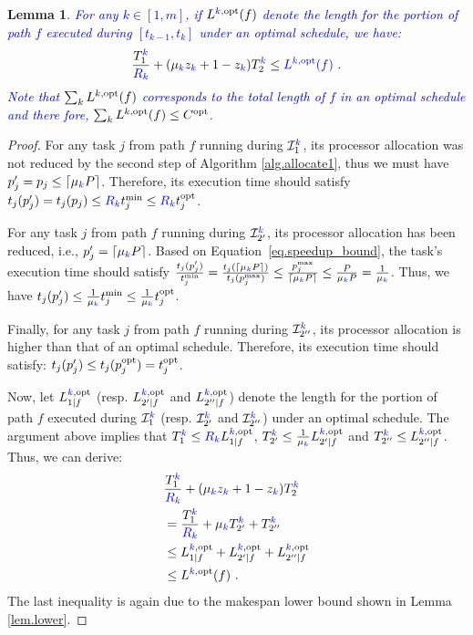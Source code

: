 \documentclass{article}
\newtheorem{lemma}{Lemma}
\newcommand\ratio{R\xspace}
\newcommand\opt{\textnormal{opt}\xspace}
\newcommand{\new}[1]{\textcolor{blue}{#1}}
\begin{document}
\begin{lemma}\label{lem.path}
\new{For any $k \in [1,m]$, if $L^{\new{k},\opt}(f)$ denote the length for the portion of path $f$ executed
during $[t_{k-1},t_k]$ under an optimal schedule, we have:}
\begin{equation}\label{CP}
\frac{T_1^{\new{k}}}{\new{\ratio_k}}  + (\mu_{\new{k}} z_{\new{k}}+1-z_{\new{k}}) T_2^{\new{k}} \le \new{L^{k,\opt}(f)} \ .
\end{equation}
\new{Note that $\sum_k L^{k,\opt}(f)$ corresponds to the total length of $f$ in an optimal schedule and there fore, $\sum_k L^{k,\opt}(f) \leq C^{\opt}$.}
\end{lemma}


\begin{proof}

For any task $j$ from path $f$ running during $\mathcal{I}_1^{\new{k}}$, its processor allocation was not reduced by the second step of Algorithm \ref{alg.allocate1}, thus we must have $p'_j = p_j \le \lceil \mu_{\new{k}} P \rceil$. Therefore, its execution time should satisfy $t_j(p'_j) = t_j(p_j) \le \new{\ratio_k} t_j^{\min} \le \new{\ratio_k} t_j^{\opt}$.

For any task $j$ from path $f$ running during $\mathcal{I}_{2'}^{\new{k}}$, its processor allocation has been reduced, i.e., $p'_j = \lceil \mu_{\new{k}} P \rceil$. Based on
Equation~\eqref{eq.speedup_bound}, the task's execution time should satisfy $\frac{t_j(p'_j)}{t_j^{\min}} = \frac{t_j(\lceil \mu_{\new{k}} P \rceil)}{t_j(p_j^{\max})} \le \frac{p_j^{\max}}{\lceil \mu_{\new{k}} P \rceil} \le \frac{P}{\mu_{\new{k}} P} = \frac{1}{\mu_{\new{k}}}$. Thus, we have $t_j(p'_j) \le \frac{1}{\mu_{\new{k}}} t_j^{\min} \le \frac{1}{\mu_{\new{k}}} t_j^{\opt}$.

Finally, for any task $j$ from path $f$ running during $\mathcal{I}_{2''}^{\new{k}}$, its processor allocation is higher than that of an optimal schedule. Therefore, its execution time should satisfy: $t_j(p'_j) \le t_j(p_j^{\opt}) = t_j^{\opt}$.

Now, let $L^{\new{k},\opt}_{1|f}$ (resp. $L^{\new{k},\opt}_{2'|f}$ and $L^{\new{k},\opt}_{2''|f}$) denote the length for the portion of path $f$ executed
during $\mathcal{I}_1^{\new{k}}$ (resp. $\mathcal{I}_{2'}^{\new{k}}$ and $\mathcal{I}_{2''}^{\new{k}}$) under an optimal schedule. The argument above implies that $T_1^{\new{k}} \le \new{\ratio_k} L^{\new{k},\opt}_{1|f}$, $T_{2'}^{\new{k}} \le \frac{1}{\mu_{\new{k}}} L^{\new{k},\opt}_{2'|f}$ and $T_{2''}^{\new{k}} \le L^{\new{k},\opt}_{2''|f}$.
Thus, we can derive:
\begin{align*}
& \frac{T_1^{\new{k}}}{\new{\ratio_k}}  + (\mu_{\new{k}} z_{\new{k}}+1-z_{\new{k}}) T_2^{\new{k}} \\
&= \frac{T_1^{\new{k}}}{\new{\ratio_k}} + \mu_{\new{k}} T_{2'}^{\new{k}}+ T_{2''}^{\new{k}} \\
&\le L^{\new{k},\opt}_{1|f} + L^{\new{k},\opt}_{2'|f} + L^{\new{k},\opt}_{2''|f} \\
&\le L^{\new{k},\opt}(f)\ .
\end{align*}
The last inequality is again due to the makespan lower bound shown in Lemma \ref{lem.lower}.


\end{proof}
\end{document}
